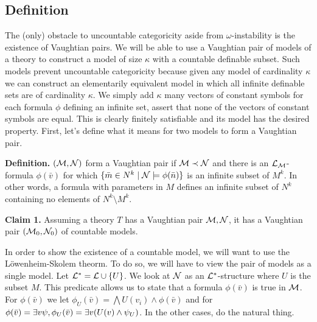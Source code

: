 \subsection{Definition}
The (only) obstacle to uncountable categoricity aside from \(\omega\)-instability is the existence of Vaughtian pairs. %
We will be able to use a Vaughtian pair of models of a theory to construct a model of size \(\kappa\) with a countable definable subset.  
Such models prevent uncountable categoricity because given any model of cardinality \(\kappa\) we can construct an elementarily equivalent model in which all infinite definable sets are of cardinality \(\kappa\).
We simply add \(\kappa\) many vectors of constant symbols for each formula \(\phi\) defining an infinite set, assert that none of the vectors of constant symbols are equal. This is clearly finitely satisfiable and its model has the desired property.
First, let's define what it means for two models to form a Vaughtian pair. %

\textbf{Definition.} \((\mathcal{M}, \mathcal{N})\) form a Vaughtian pair if \(\mathcal{M} \prec \mathcal{N}\) and there is an \(\mathcal{L}_{\mathcal{M}}\)-formula \(\phi(\bar{v})\) for which
\(\{\bar{m} \in N^k \mid \mathcal{N} \models \phi(\bar{n})\}\) is an infinite subset of \(M^k\). %
In other words, a formula with parameters in \(M\) defines an infinite subset of \(N^k\) containing no elements of \(N^k \setminus M^k\).

\textbf{Claim 1.} Assuming a theory \(T\) has a Vaughtian pair \(\mathcal{M}, \mathcal{N}\), it has a Vaughtian pair \((\mathcal{M}_0, \mathcal{N}_0)\) of countable models. 

In order to show the existence of a countable model, we will want to use the L\"owenheim-Skolem theorm.
To do so, we will have to view the pair of models as a single model. 
Let  \(\mathcal{L}^* = \mathcal{L} \cup \{U\}\). 
We look at \(\mathcal{N}\) as an \(\mathcal{L}^*\)-structure where \(U\) is the subset \(M\). 
This predicate allows us to state that a formula \(\phi(\bar{v})\) is true in \(\mathcal{M}\).
For \(\phi(\bar{v})\) \qf we let \(\phi_U(\bar{v}) = \bigwedge U(v_i) \land \phi(\bar{v})\) and for \(\phi(\bar{v}) = \exists v \psi, \phi_U(\bar{v}) = \exists v (U(v) \land \psi_U)\). 
In the other cases, do the natural thing. %

